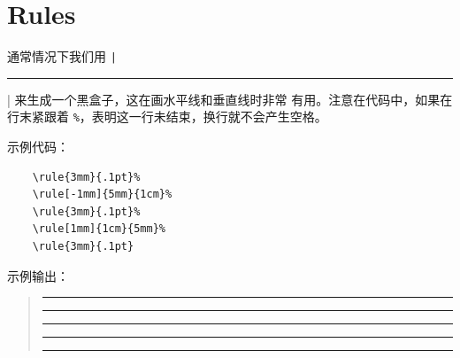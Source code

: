\documentclass[UTF8]{ctexart}
\begin{document}
\section{Rules}
通常情况下我们用 \texttt|\rule[lift]{width}{height}| 来生成一个黑盒子，这在画水平线和垂直线时非常
有用。注意在代码中，如果在行末紧跟着 \texttt{\%}，表明这一行未结束，换行就不会产生空格。

示例代码：
\begin{verbatim}
    \rule{3mm}{.1pt}%
    \rule[-1mm]{5mm}{1cm}%
    \rule{3mm}{.1pt}%
    \rule[1mm]{1cm}{5mm}%
    \rule{3mm}{.1pt}
\end{verbatim}

示例输出：
\begin{quote}
    \rule{3mm}{.1pt}%
    \rule[-1mm]{5mm}{1cm}%
    \rule{3mm}{.1pt}%
    \rule[1mm]{1cm}{5mm}%
    \rule{3mm}{.1pt}
\end{quote}
\end{document}
